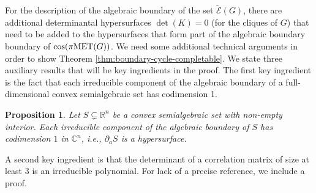 \documentclass[a4paper, 11pt, twoside]{article}
\newcommand{\C}{\mathbb{C}}
\newcommand{\R}{\mathbb{R}}
\newcommand{\ME}{{\mathcal E}}
\newcommand{\MET}{\text{\rm MET}}
\newcommand{\tME}{\widetilde \ME}
\theoremstyle{plain}
\newtheorem{proposition}[theorem]{Proposition}
\begin{document}
For the description of the algebraic boundary of the set $\tME(G)$, there are additional determinantal hypersurfaces $\det(K)=0$ (for the cliques of $G$) 
that need to be added  
to the hypersurfaces that form part of the algebraic boundary boundary of $\cos(\pi \MET(G))$. We need some additional technical arguments in order to show Theorem \ref{thm:boundary-cycle-completable}. We state three auxiliary results that will be key ingredients in the proof. The first key ingredient is the fact that each irreducible component of the algebraic boundary of a full-dimensional convex semialgebraic set has codimension 1. 
 
\begin{proposition}\label{lemma:algboundconvex} \cite[Lemma 2.5]{sinn2015algebraicboundary}
    Let $ S \subsetneq \R^n$ be a convex semialgebraic set with non-empty interior. Each irreducible component of the algebraic boundary of $S$ has codimension $1$ in $\C^n$, i.e., $\partial_a S$ is a hypersurface.
\end{proposition}



A second key  ingredient is  that the determinant of a correlation matrix of size at least 3 is an irreducible polynomial. For lack of a precise reference, we include a proof. 
\end{document}
